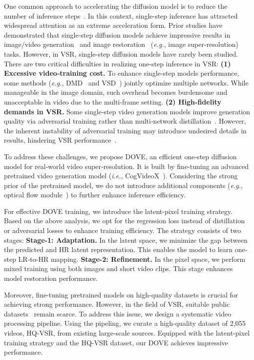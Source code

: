 \documentclass{article}
\newcommand\eg{\textit{e.g.}}
\newcommand\ie{\textit{i.e.}}
\begin{document}
One common approach to accelerating the diffusion model is to reduce the number of inference steps~\cite{song2020denoising,lu2022dpm}. In this context, single-step inference has attracted widespread attention as an extreme acceleration form. Prior studies have demonstrated that single-step diffusion models achieve impressive results in image/video generation~\cite{sauer2024fast,yin2024improved,zhang2024sf,lin2025diffusion} and image restoration~\cite{wang2023sinsr,wu2024one,li2024distillation} (\eg, image super-resolution) tasks. However, in VSR, single-step diffusion models have rarely been studied.
There are two critical difficulties in realizing one-step inference in VSR:
\textbf{(1) Excessive video‑training cost.} To enhance single-step models performance, some methods (\eg, DMD~\cite{yin2024one} and VSD~\cite{wang2023prolificdreamer,wu2024one}) jointly optimize multiple networks. While manageable in the image domain, such overhead becomes burdensome and unacceptable in video due to the multi-frame setting.
\textbf{(2) High‑fidelity demands in VSR.} Some single‑step video generation models improve generation quality via adversarial training rather than multi‑network distillation~\cite{zhang2024sf,lin2025diffusion}. However, the inherent instability of adversarial training may introduce undesired details in results, hindering VSR performance~\cite{wu2024one}.

To address these challenges, we propose DOVE, an efficient one‑step diffusion model for real‑world video super‑resolution. It is built by fine-tuning an advanced pretrained video generation model (\ie, CogVideoX~\cite{yang2024cogvideox}). Considering the strong prior of the pretrained model, we do not introduce additional components (\eg, optical flow module~\cite{yang2024motion,zhou2024upscale}) to further enhance inference efficiency. 

For effective DOVE training, we introduce the latent-pixel training strategy. Based on the above analysis, we opt for the regression loss instead of distillation or adversarial losses to enhance training efficiency.
The strategy consists of two stages:
\textbf{Stage-1: Adaptation.} In the latent space, we minimize the gap between the predicted and HR latent representation. This enables the model to learn one-step LR‑to‑HR mapping.
\textbf{Stage-2: Refinement.} In the pixel space, we perform mixed training using both images and short video clips. This stage enhances model restoration performance. 

Moreover, fine-tuning pretrained models on high-quality datasets is crucial for achieving strong performance. However, in the field of VSR, suitable public datasets~\cite{zhou2024upscale,nan2024openvid} remain scarce. To address this issue, we design a systematic video processing pipeline. Using the pipeling, we curate a high-quality dataset of 2,055 videos, HQ-VSR, from existing large-scale sources. Equipped with the latent-pixel training strategy and the HQ-VSR dataset, our DOVE achieves impressive performance.
\end{document}
